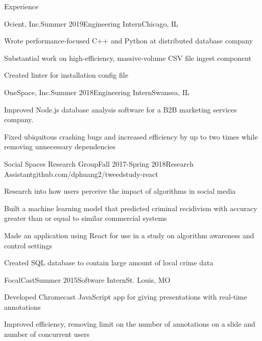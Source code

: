 \documentclass{resume} %
\begin{document}
            \begin{rSection}{Experience}
                \begin{rSubsection}{Ocient, Inc.}{Summer 2019}{Engineering Intern}{Chicago, IL} 
                \item Wrote performance-focused C++ and Python at distributed database company
                \item Substantial work on high-efficiency, massive-volume CSV file ingest component
                \item Created linter for installation config file
                \end{rSubsection}

                \begin{rSubsection}{OneSpace, Inc.}{Summer 2018}{Engineering Intern}{Swansea, IL} 
                \item Improved Node.js database analysis software for a B2B marketing services company. 
                \item Fixed ubiquitous crashing bugs and increased efficiency by up to two times while removing unnecessary dependencies
                \end{rSubsection}

                \begin{rSubsection}{Social Spaces Research Group}{Fall 2017-Spring 2018}{Research Assistant}{github.com/dphuang2/tweedstudy-react}{}
                \item Research into how users perceive the impact of algorithms in social media
                \item Built a machine learning model that predicted criminal recidivism with accuracy greater than or equal to similar commercial systems
                \item Made an application using React for use in a study on algorithm awareness and control settings
                \item Created SQL database to contain large amount of local crime data
                \end{rSubsection}

                \begin{rSubsection}{FocalCast}{Summer 2015}{Software Intern}{St. Louis, MO}{}
                \item Developed Chromecast JavaScript app for giving presentations with real-time annotations
                \item Improved efficiency, removing limit on the number of annotations on a slide and number of concurrent users
                \end{rSubsection}

            \end{rSection}
\end{document}
